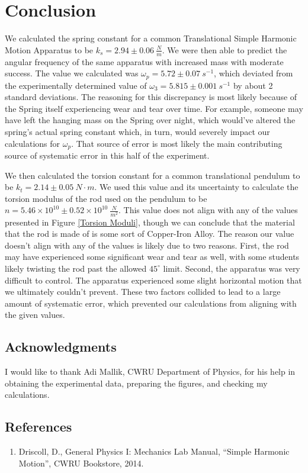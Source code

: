 \documentclass[12pt]{article}
\begin{document}
\section{Conclusion}
We calculated the spring constant for a common Translational Simple Harmonic Motion Apparatus to be $k_s=2.94\pm0.06\ \frac{N}{m}$. We were then able to predict the angular frequency of the same apparatus with increased mass with moderate success. The value we calculated was $\omega_p=5.72\pm0.07\ s^{-1}$, which deviated from the experimentally determined value of $\omega_3=5.815\pm0.001\ s^{-1}$ by about 2 standard deviations. The reasoning for this discrepancy is most likely because of the Spring itself experiencing wear and tear over time. For example, someone may have left the hanging mass on the Spring over night, which would've altered the spring's actual spring constant which, in turn, would severely impact our calculations for $\omega_p$. That source of error is most likely the main contributing source of systematic error in this half of the experiment. \par
We then calculated the torsion constant for a common translational pendulum to be $k_t=2.14\pm0.05\ N\cdot m$. We used this value and its uncertainty to calculate the torsion modulus of the rod used on the pendulum to be $n=5.46\times10^{10}\pm0.52\times10^{10}\ \frac{N}{m^2}$. This value does not align with any of the values presented in Figure \ref{Torsion Moduli}, though we can conclude that the material that the rod is made of is some sort of Copper-Iron Alloy. The reason our value doesn't align with any of the values is likely due to two reasons. First, the rod may have experienced some significant wear and tear as well, with some students likely twisting the rod past the allowed $45^\circ$ limit. Second, the apparatus was very difficult to control. The apparatus experienced some slight horizontal motion that we ultimately couldn't prevent. These two factors collided to lead to a large amount of systematic error, which prevented our calculations from aligning with the given values.

\subsection{Acknowledgments}
I would like to thank Adi Mallik, CWRU Department of Physics, for his help in obtaining the experimental data, preparing the figures, and checking my calculations.

\subsection{References}
\begin{enumerate}
    \item Driscoll, D., General Physics I: Mechanics Lab Manual, “Simple Harmonic Motion”, CWRU Bookstore, 2014.
\end{enumerate}
\end{document}
